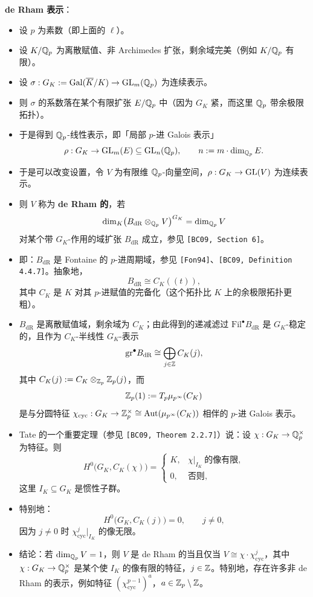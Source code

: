 \textbf{de Rham 表示}：
\begin{itemize}
\item 设 $p$ 为素数（即上面的 $\ell$）。
\item 设 $K/\mathbb{Q}_p$ 为离散赋值、非 Archimedes 扩张，剩余域完美（例如 $K/\mathbb{Q}_p$ 有限）。
\item 设 $\sigma:G_K:=\operatorname{Gal}(\overline K/K)\to\operatorname{GL}_m(\mathbb{Q}_p)$ 为连续表示。
\item 则 $\sigma$ 的系数落在某个有限扩张 $E/\mathbb{Q}_p$ 中（因为 $G_K$ 紧，而这里 $\mathbb{Q}_p$ 带余极限拓扑）。
\item 于是得到 $\mathbb{Q}_p$-线性表示，即「局部 $p$-进 Galois 表示」
\[
\rho:G_K\to\operatorname{GL}_m(E)\subseteq\operatorname{GL}_n(\mathbb{Q}_p),\qquad n:=m\cdot\dim_{\mathbb{Q}_p}E.
\]
\item 于是可以改变设置，令 $V$ 为有限维 $\mathbb{Q}_p$-向量空间，$\rho:G_K\to\operatorname{GL}(V)$ 为连续表示。
\item 则 $V$ 称为 \textbf{de Rham 的}，若
\[
\dim_K\bigl(B_{\mathrm{dR}}\otimes_{\mathbb{Q}_p}V\bigr)^{G_K}=\dim_{\mathbb{Q}_p}V
\]
对某个带 $G_K$-作用的域扩张 $B_{\mathrm{dR}}$ 成立，参见 \texttt{[BC09, Section 6]}。
\item 即：$B_{\mathrm{dR}}$ 是 Fontaine 的 $p$-进周期域，参见 \texttt{[Fon94]}、\texttt{[BC09, Definition 4.4.7]}。抽象地，
\[
B_{\mathrm{dR}}\cong C_K((t)),
\]
其中 $C_K$ 是 $K$ 对其 $p$-进赋值的完备化（这个拓扑比 $K$ 上的余极限拓扑更粗）。
\item $B_{\mathrm{dR}}$ 是离散赋值域，剩余域为 $C_K$；由此得到的递减滤过 $\mathrm{Fil}^\bullet B_{\mathrm{dR}}$ 是 $G_K$-稳定的，且作为 $C_K$-半线性 $G_K$-表示
\[
\mathrm{gr}^\bullet B_{\mathrm{dR}}\cong\bigoplus_{j\in\mathbb{Z}}C_K(j),
\]
其中 $C_K(j):=C_K\otimes_{\mathbb{Z}_p}\mathbb{Z}_p(j)$，而
\[
\mathbb{Z}_p(1):=T_p\mu_{p^\infty}(C_K)
\]
是与分圆特征 $\chi_{\mathrm{cyc}}:G_K\to\mathbb{Z}_p^\times\cong\operatorname{Aut}(\mu_{p^\infty}(C_K))$ 相伴的 $p$-进 Galois 表示。
\item Tate 的一个重要定理（参见 \texttt{[BC09, Theorem 2.2.7]}）说：设 $\chi:G_K\to\mathbb{Q}_p^\times$ 为特征。则
\[
H^0\bigl(G_K,C_K(\chi)\bigr)=
\begin{cases}
K,&\chi|_{I_K}\ \text{的像有限},\\
0,&\text{否则},
\end{cases}
\]
这里 $I_K\subseteq G_K$ 是惯性子群。
\item 特别地：
\[
H^0\bigl(G_K,C_K(j)\bigr)=0,\qquad j\neq0,
\]
因为 $j\neq0$ 时 $\chi_{\mathrm{cyc}}^j|_{I_K}$ 的像无限。
\item 结论：若 $\dim_{\mathbb{Q}_p}V=1$，则 $V$ 是 de Rham 的当且仅当 $V\cong\chi\cdot\chi_{\mathrm{cyc}}^j$，其中 $\chi:G_K\to\mathbb{Q}_p^\times$ 是某个使 $I_K$ 的像有限的特征，$j\in\mathbb{Z}$。特别地，存在许多非 de Rham 的表示，例如特征 $(\chi_{\mathrm{cyc}}^{p-1})^a$，$a\in\mathbb{Z}_p\setminus\mathbb{Z}$。

\end{itemize}
